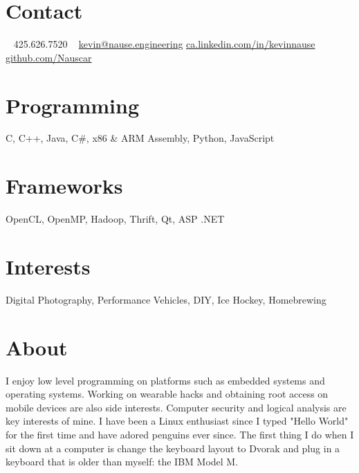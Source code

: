 \documentclass[print]{friggeri-cv} %
\begin{document}


\begin{aside} %
\section{Contact}
~
425.626.7520
~
{\scriptsize \href{mailto:kevin@nause.engineering}{kevin@nause.engineering}}
{\scriptsize \href{https://ca.linkedin.com/in/kevinnause}{ca.linkedin.com/in/kevinnause}}
{\scriptsize \href{https://github.com/Nauscar}{github.com/Nauscar}}
\section{Programming}
C, C++, Java, C\#, 
x86 \& ARM Assembly, 
Python, JavaScript
\section{Frameworks}
OpenCL, OpenMP,
Hadoop, Thrift, 
Qt, ASP .NET
\section{Interests}
{Digital Photography, Performance Vehicles, DIY, Ice Hockey, Homebrewing}
\section{About}
{I enjoy low level programming on platforms such as embedded systems and operating systems.
Working on wearable hacks and obtaining root access on mobile devices are also side interests. 
Computer security and logical analysis are key interests of mine. 
I have been a Linux enthusiast since I typed "Hello World" for the first time and have adored penguins ever since. 
The first thing I do when I sit down at a computer is change the keyboard layout to Dvorak and plug in a keyboard that is older than myself: the IBM Model M.}
\end{aside}

\end{document}
